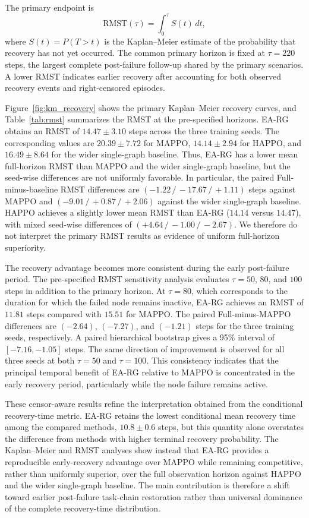 The primary endpoint is
\begin{equation}
\mathrm{RMST}(\tau)=\int_{0}^{\tau} S(t)\,dt,
\label{eq:rmst}
\end{equation}
where $S(t)=P(T>t)$ is the Kaplan--Meier estimate of the probability that recovery has not yet occurred. The common primary horizon is fixed at $\tau=220$ steps, the largest complete post-failure follow-up shared by the primary scenarios. A lower RMST indicates earlier recovery after accounting for both observed recovery events and right-censored episodes.

Figure~\ref{fig:km_recovery} shows the primary Kaplan--Meier recovery curves, and Table~\ref{tab:rmst} summarizes the RMST at the pre-specified horizons. EA-RG obtains an RMST of $14.47 \pm 3.10$ steps across the three training seeds. The corresponding values are $20.39 \pm 7.72$ for MAPPO, $14.14 \pm 2.94$ for HAPPO, and $16.49 \pm 8.64$ for the wider single-graph baseline. Thus, EA-RG has a lower mean full-horizon RMST than MAPPO and the wider single-graph baseline, but the seed-wise differences are not uniformly favorable. In particular, the paired Full-minus-baseline RMST differences are $(-1.22\,/\,-17.67\,/\,+1.11)$ steps against MAPPO and $(-9.01\,/\,+0.87\,/\,+2.06)$ against the wider single-graph baseline. HAPPO achieves a slightly lower mean RMST than EA-RG ($14.14$ versus $14.47$), with mixed seed-wise differences of $(+4.64\,/\,-1.00\,/\,-2.67)$. We therefore do not interpret the primary RMST results as evidence of uniform full-horizon superiority.

The recovery advantage becomes more consistent during the early post-failure period. The pre-specified RMST sensitivity analysis evaluates $\tau = 50$, $80$, and $100$ steps in addition to the primary horizon. At $\tau = 80$, which corresponds to the duration for which the failed node remains inactive, EA-RG achieves an RMST of $11.81$ steps compared with $15.51$ for MAPPO. The paired Full-minus-MAPPO differences are $(-2.64)$, $(-7.27)$, and $(-1.21)$ steps for the three training seeds, respectively. A paired hierarchical bootstrap gives a 95\% interval of $[-7.16, -1.05]$ steps. The same direction of improvement is observed for all three seeds at both $\tau = 50$ and $\tau = 100$. This consistency indicates that the principal temporal benefit of EA-RG relative to MAPPO is concentrated in the early recovery period, particularly while the node failure remains active.

These censor-aware results refine the interpretation obtained from the conditional recovery-time metric. EA-RG retains the lowest conditional mean recovery time among the compared methods, $10.8 \pm 0.6$ steps, but this quantity alone overstates the difference from methods with higher terminal recovery probability. The Kaplan--Meier and RMST analyses show instead that EA-RG provides a reproducible early-recovery advantage over MAPPO while remaining competitive, rather than uniformly superior, over the full observation horizon against HAPPO and the wider single-graph baseline. The main contribution is therefore a shift toward earlier post-failure task-chain restoration rather than universal dominance of the complete recovery-time distribution.

